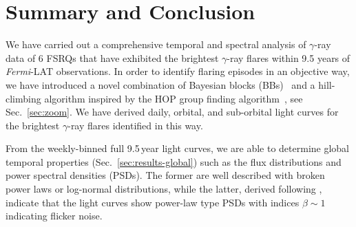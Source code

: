 \documentclass[twocolumn,linenumbers]{aastex62}
\newcommand{\gray}{$\gamma$-ray\xspace}
\newcommand{\fermiLAT}{\emph{Fermi}-LAT\xspace}
\begin{document}
\section{Summary and Conclusion}
\label{sec:conclusion}

We have carried out a comprehensive temporal and spectral analysis of  \gray data of 6 FSRQs that have exhibited the brightest \gray flares within 9.5 years of \fermiLAT observations.
In order to identify flaring episodes in an objective way, we have introduced a novel combination of Bayesian blocks (BBs)~\citep{2013ApJ...764..167S} and a hill-climbing algorithm inspired by the HOP group finding algorithm~\citep{1998ApJ...498..137E}, see Sec.~\ref{sec:zoom}.
We have derived daily, orbital, and sub-orbital light curves for the brightest \gray flares identified in this way.

From the weekly-binned full 9.5\,year light curves, we are able to determine global temporal properties (Sec.~\ref{sec:results-global}) such as the flux distributions and power spectral densities (PSDs). 
The former are well described with broken power laws or log-normal distributions, while the latter, derived following \citet{2014MNRAS.445..437M}, indicate that the light curves show power-law type PSDs with indices $\beta\sim 1$ indicating flicker noise.
\end{document}
